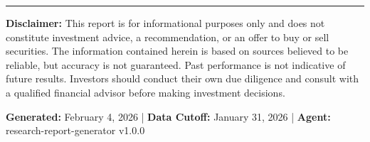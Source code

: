\documentclass[11pt,a4paper]{article}
\begin{document}
\vfill
\hrule
\vspace{8pt}
{\scriptsize\color{msgray}
\textbf{Disclaimer:} This report is for informational purposes only and does not constitute investment advice, a recommendation, or an offer to buy or sell securities. The information contained herein is based on sources believed to be reliable, but accuracy is not guaranteed. Past performance is not indicative of future results. Investors should conduct their own due diligence and consult with a qualified financial advisor before making investment decisions.

\vspace{4pt}
\textbf{Generated:} February 4, 2026 | \textbf{Data Cutoff:} January 31, 2026 | \textbf{Agent:} research-report-generator v1.0.0
}
\end{document}
